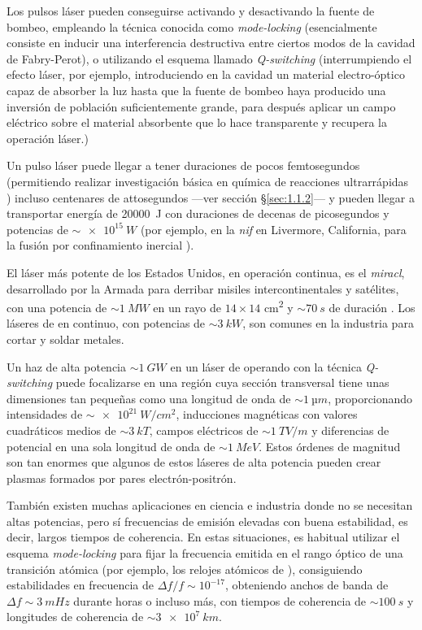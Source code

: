 Los pulsos láser pueden conseguirse activando y desactivando la fuente de bombeo, empleando la técnica conocida como \emph{mode-locking} (esencialmente consiste en inducir una interferencia destructiva entre ciertos modos de la cavidad de Fabry-Perot), o utilizando el esquema llamado \emph{Q-switching} (interrumpiendo el efecto láser, por ejemplo, introduciendo en la cavidad un material electro-óptico capaz de absorber la luz hasta que la fuente de bombeo haya producido una inversión de población suficientemente grande, para después aplicar un campo eléctrico sobre el material absorbente que lo hace transparente y recupera la operación láser.)

Un pulso láser puede llegar a tener duraciones de pocos femtosegundos (permitiendo realizar investigación básica en química de reacciones ultrarrápidas \autocite{Zewail2000}) incluso centenares de attosegundos ---ver sección \S\ref{sec:1.1.2}--- y pueden llegar a transportar energía de \qty{20000}{J} con duraciones de decenas de picosegundos y potencias de $\sim \qty{e15}{W}$ (por ejemplo, en la \emph{\acrfull{nif}} en Livermore, California, para la fusión por confinamiento inercial \autocite{Hurricane2019,Zylstra2022}).

El láser más potente de los Estados Unidos, en operación continua, es el \emph{\acrfull{miracl}}, desarrollado por la Armada para derribar misiles intercontinentales y satélites, con una potencia de $\sim \qty{1}{MW}$ en un rayo de $14 \times 14 $ \unit{cm^{2}} y $\sim \qty{70}{s}$ de duración \autocite{Thorne2017}. Los láseres de  en continuo, con potencias de $\sim \qty{3}{kW}$, son comunes en la industria para cortar y soldar metales.

Un haz de alta potencia $\sim \qty{1}{GW}$ en un láser de  operando con la técnica \emph{Q-switching} puede focalizarse en una región cuya sección transversal tiene unas dimensiones tan pequeñas como una longitud de onda de $\sim \qty{1}{µm}$, proporcionando intensidades de $\sim \qty{e21}{W/cm^{2}}$, inducciones magnéticas con valores cuadráticos medios de $\sim \qty{3}{kT}$, campos eléctricos de $\sim \qty{1}{TV/m}$ y diferencias de potencial en una sola longitud de onda de $\sim \qty{1}{MeV}$. Estos órdenes de magnitud son tan enormes que algunos de estos láseres de alta potencia pueden crear plasmas formados por pares electrón-positrón.

También existen muchas aplicaciones en ciencia e industria donde no se necesitan altas potencias, pero sí frecuencias de emisión elevadas con buena estabilidad, es decir, largos tiempos de coherencia. En estas situaciones, es habitual utilizar el esquema \emph{mode-locking} para fijar la frecuencia emitida en el rango óptico de una transición atómica (por ejemplo, los relojes atómicos de ), consiguiendo estabilidades en frecuencia de $\Delta f/f \sim 10^{-17}$, obteniendo anchos de banda de $\Delta f \sim \qty{3}{mHz}$ durante horas o incluso más, con tiempos de coherencia de $\sim \qty{100}{s}$ y longitudes de coherencia de $\sim \qty{3e7}{km}$. 

